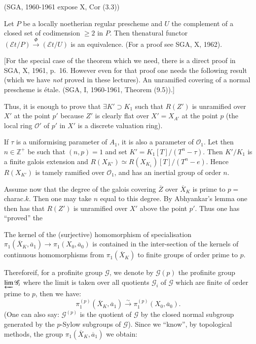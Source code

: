 \begin{thm}
(SGA, 1960-1961 expose X, Cor (3.3))
\end{thm}

Let $P$ be a locally noetherian regular prescheme and $U$ the
complement of a closed set of codimension $\geq 2$ in $P$. Then
the\pageoriginale natural functor
$(\mathscr{E}t/P)\xrightarrow{\Phi}(\mathscr{E}t/U)$ is an
equivalence. (For a proof see SGA, X, 1962).

[For the special case of the theorem which we need, there is a direct
proof in SGA, X, 1961, p.~16. However even for that proof one needs
the following result (which we have {\em not} proved in these
lectures). An unramified covering of a normal prescheme
is \'etale. (SGA, I, 1960-1961, Theorem (9.5)).]

Thus, it is enough to prove that $\exists K'\supset K_{1}$ such that
$R(Z')$ is unramified over $X'$ at the point $p'$ because $Z'$ is
clearly flat over $X'=X_{A'}$ at the point $p$ (the local ring
$\mathscr{O}'$ of $p'$ in $X'$ is a discrete valuation ring).

If $\tau$ is a uniformising parameter of $A_{1}$, it is also a
parameter of $\mathscr{O}_{1}$. Let then $n\in \mathbb{Z}^{+}$ be
such that $(n,p)=1$ and set $K'=K_{1}[T]/(T^{n}-\tau)$. Then
$K'/K_{1}$ is a finite galois extension and $R(X_{K'})\simeq
R(X_{K_{1}})[T]/(T^{n}-e)$. Hence $R(X_{K'})$ is tamely ramified
over $\mathscr{O}_{1}$, and has an inertial group of order $n$.

Assume now that the degree of the galois covering $\overline{Z}$ over
$\overline{X}_{K}$ is prime to $p=$ charac.$k$. Then one may take $n$
equal to this degree. By Abhyankar's lemma one then has that $R(Z')$
is unramified over $X'$ above the point $p'$. Thus one has ``proved''
the 

\setcounter{proposition}{2}
\begin{proposition}
The kernel of the (surjective) homomorphism of specialisation
$\pi_{1}(\overline{X}_{K},\overline{a}_{1})\to \pi_{1}(X_{0},\overline{a}_{0})$
is contained in the inter-section of the kernels of continuous
homomorphisms from $\pi_{1}(\overline{X}_{K})$ to finite groups of
order prime to $p$.
\end{proposition}

Therefore\pageoriginale if, for a profinite group $\mathscr{G}$, we
denote by $\mathscr{G}(p)$ the profinite group
$\varprojlim \mathscr{G}_{i}$ where the limit is taken over all
quotients $\mathscr{G}_{i}$ of $\mathscr{G}$ which are finite of order
prime to $p$, then we have:
$$
\pi^{(p)}_{1}(\overline{X}_{K},\overline{a}_{1})\xrightarrow{\sim}\pi^{(p)}_{1}(X_{0},\overline{a}_{0}). 
$$
(One can also say: $\mathscr{G}^{(p)}$ is the quotient of
$\mathscr{G}$ by the closed normal subgroup generated by the $p$-Sylow
subgroups of $\mathscr{G}$). Since we ``know'', by topological
methods, the group $\pi_{1}(\overline{X}_{K},\overline{a}_{1})$ we
obtain: 

